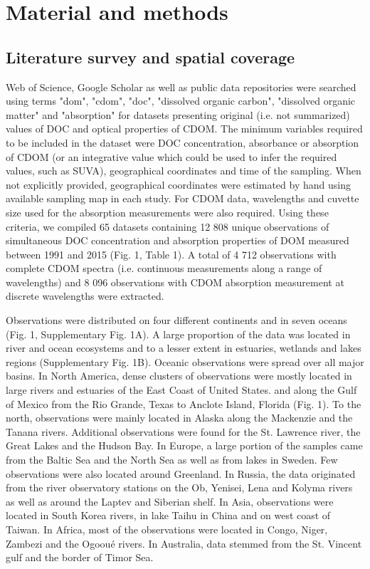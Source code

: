 
\section*{Material and methods}
\label{sec:Material and methods}

\subsection*{Literature survey and spatial coverage}

Web of Science, Google Scholar as well as public data repositories were searched using terms "dom", "cdom", "doc", "dissolved organic carbon", "dissolved organic matter" and "absorption" for datasets presenting original (i.e. not summarized) values of DOC and optical properties of CDOM. The minimum variables required to be included in the dataset were DOC concentration, absorbance or absorption of CDOM (or an integrative value which could be used to infer the required values, such as SUVA), geographical coordinates and time of the sampling. When not explicitly provided, geographical coordinates were estimated by hand using available sampling map in each study. For CDOM data, wavelengths and cuvette size used for the absorption measurements were also required. Using these criteria, we compiled 65 datasets containing 12 808 unique observations of simultaneous DOC concentration and absorption properties of DOM measured between 1991 and 2015 (Fig. 1, Table 1). A total of 4 712 observations with complete CDOM spectra (i.e. continuous measurements along a range of wavelengths) and 8 096 observations with CDOM absorption measurement at discrete wavelengths were extracted.

Observations were distributed on four different continents and in seven oceans (Fig. 1, Supplementary Fig. 1A). A large proportion of the data was located in river and ocean ecosystems and to a lesser extent in estuaries, wetlands and lakes regions (Supplementary Fig. 1B). Oceanic observations were spread over all major basins. In North America, dense clusters of observations were mostly located in large rivers and estuaries of the East Coast of United States. and along the Gulf of Mexico from the Rio Grande, Texas to Anclote Island, Florida (Fig. 1). To the north, observations were mainly located in Alaska along the Mackenzie and the Tanana rivers. Additional observations were found for the St. Lawrence river, the Great Lakes and the Hudson Bay. In Europe, a large portion of the samples came from the Baltic Sea and the North Sea as well as from lakes in Sweden. Few observations were also located around Greenland. In Russia, the data originated from the river observatory stations on the Ob, Yenisei, Lena and Kolyma rivers as well as around the Laptev and Siberian shelf. In Asia, observations were located in South Korea rivers, in lake Taihu in China and on west coast of Taiwan. In Africa, most of the observations were located in Congo, Niger, Zambezi and the Ogooué rivers. In Australia, data stemmed from the St. Vincent gulf and the border of Timor Sea.

